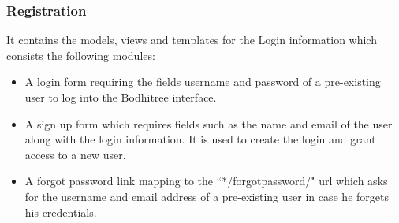 \subsubsection*{Registration}
It contains the models, views and templates for the Login information which consists the following modules:
\begin{itemize}
\item A login form requiring the fields username and password of a pre-existing user to log into the Bodhitree interface.
\item A sign up form which requires fields such as the name and email of the user along with the login information. It is used to create the login and grant access to a new user.
\item A forgot password link mapping to the ``*/forgotpassword/" url which asks for the username and email address of a pre-existing user in case he forgets his credentials.
\end{itemize}

